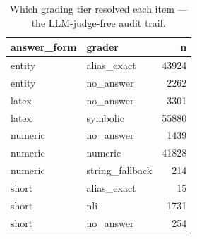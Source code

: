 \begin{table}
\caption{Which grading tier resolved each item — the LLM-judge-free audit trail.}
\label{tab:t4_grader_tier_usage}
\begin{tabular}{llr}
\toprule
answer\_form & grader & n \\
\midrule
entity & alias\_exact & 43924 \\
entity & no\_answer & 2262 \\
latex & no\_answer & 3301 \\
latex & symbolic & 55880 \\
numeric & no\_answer & 1439 \\
numeric & numeric & 41828 \\
numeric & string\_fallback & 214 \\
short & alias\_exact & 15 \\
short & nli & 1731 \\
short & no\_answer & 254 \\
\bottomrule
\end{tabular}
\end{table}
